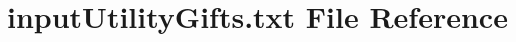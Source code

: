 \hypertarget{inputUtilityGifts_8txt}{}\section{input\+Utility\+Gifts.\+txt File Reference}
\label{inputUtilityGifts_8txt}
